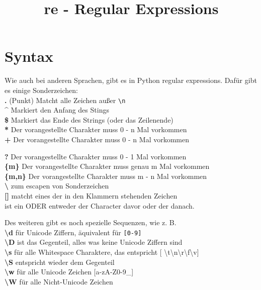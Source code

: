 \documentclass[ignorenonframetext,]{beamer}
\title{re - Regular Expressions}
\date{}
\begin{document}
\frame{\titlepage}

\section{Syntax}\label{syntax}

\begin{frame}

Wie auch bei anderen Sprachen, gibt es in Python regular expressions.
Dafür gibt es einige Sonderzeichen:\\
\textbf{.} (Punkt) Matcht alle Zeichen außer
\texttt{\textbackslash{}n}\\
\textbf{\^{}} Markiert den Anfang des Stings\\
\textbf{\$} Markiert das Ende des Strings (oder das Zeilenende)\\
\textbf{*} Der vorangestellte Charakter muss 0 - n Mal vorkommen\\
\textbf{+} Der vorangestellte Charakter muss 0 - n Mal vorkommen

\end{frame}

\begin{frame}

\textbf{?} Der vorangestellte Charakter muss 0 - 1 Mal vorkommen\\
\textbf{\{m\}} Der vorangestellte Charakter muss genau m Mal vorkommen\\
\textbf{\{m,n\}} Der vorangestellte Charakter muss m - n Mal vorkommen\\
\textbf{\textbackslash{}} zum escapen von Sonderzeichen\\
\textbf{{[}{]}} matcht eines der in den Klammern stehenden Zeichen\\
\textbf{\textbar{}} ist ein ODER entweder der Character davor oder der
danach.

\end{frame}

\begin{frame}

Des weiteren gibt es noch spezielle Sequenzen, wie z. B.\\
\textbf{\textbackslash{}d} für Unicode Ziffern, äquivalent für
\texttt{{[}0-9{]}}\\
\textbf{\textbackslash{}D} ist das Gegenteil, alles was keine Unicode
Ziffern sind\\
\textbf{\textbackslash{}s} für alle Whitespace Charaktere, das
entspricht {[}
\textbackslash{}t\textbackslash{}n\textbackslash{}r\textbackslash{}f\textbackslash{}v{]}\\
\textbf{\textbackslash{}S} entspricht wieder dem Gegenteil\\
\textbf{\textbackslash{}w} für alle Unicode Zeichen {[}a-zA-Z0-9\_{]}\\
\textbf{\textbackslash{}W} für alle Nicht-Unicode Zeichen

\end{frame}
\end{document}
